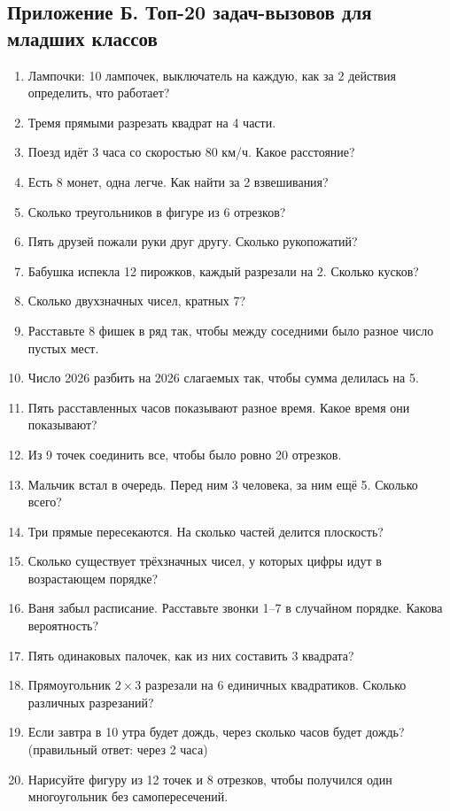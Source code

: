 \documentclass[12pt,a4paper]{article}
\begin{document}
\subsection{Приложение Б. Топ-20 задач-вызовов для младших классов}

\begin{enumerate}
  \item Лампочки: 10 лампочек, выключатель на каждую, как за $2$ действия
  определить, что работает?
  \item Тремя прямыми разрезать квадрат на 4 части.
  \item Поезд идёт 3 часа со скоростью 80 км/ч. Какое расстояние?
  \item Есть 8 монет, одна легче. Как найти за 2 взвешивания?
  \item Сколько треугольников в фигуре из 6 отрезков?
  \item Пять друзей пожали руки друг другу. Сколько рукопожатий?
  \item Бабушка испекла 12 пирожков, каждый разрезали на 2. Сколько кусков?
  \item Сколько двухзначных чисел, кратных 7?
  \item Расставьте 8 фишек в ряд так, чтобы между соседними было
  разное число пустых мест.
  \item Число 2026 разбить на 2026 слагаемых так, чтобы сумма
  делилась на 5.
  \item Пять расставленных часов показывают разное время. Какое
  время они показывают?
  \item Из 9 точек соединить все, чтобы было ровно 20 отрезков.
  \item Мальчик встал в очередь. Перед ним 3 человека, за ним
  ещё 5. Сколько всего?
  \item Три прямые пересекаются. На сколько частей делится плоскость?
  \item Сколько существует трёхзначных чисел, у которых цифры
  идут в возрастающем порядке?
  \item Ваня забыл расписание. Расставьте звонки 1--7 в случайном
  порядке. Какова вероятность?
  \item Пять одинаковых палочек, как из них составить 3 квадрата?
  \item Прямоугольник $2\times3$ разрезали на 6 единичных квадратиков.
  Сколько различных разрезаний?
  \item Если завтра в 10 утра будет дождь, через сколько часов
  будет дождь? (правильный ответ: через 2 часа)
  \item Нарисуйте фигуру из 12 точек и 8 отрезков, чтобы
  получился один многоугольник без самопересечений.
\end{enumerate}
\end{document}
